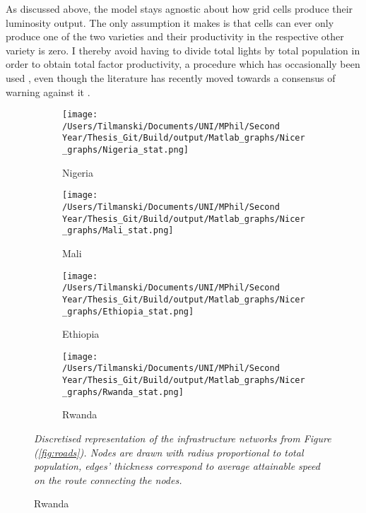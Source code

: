 \documentclass[11pt, oneside]{article}   	%
\let\oldref\ref
\renewcommand{\ref}[1]{(\oldref{#1})}
\newcommand{\mysubcaption}[1]{
\justify
\begin{spacing}{0.7}
\textit{\footnotesize #1}
\end{spacing}}
\begin{document}
As discussed above, the model stays agnostic about how grid cells produce their luminosity output. The only assumption it makes is that cells can ever only produce one of the two varieties and their productivity in the respective other variety is zero. I thereby avoid having to divide total lights by total population in order to obtain total factor productivity, a procedure which has occasionally been used \citep[see e.g.][]{DeLuca_Ethnicfavoritismaxiom_2018}, even though the literature has recently moved towards a consensus of warning against it \citep{Michalopoulos_SpatialPatternsDevelopment_2018}.

\begin{figure}[t]
\centering
\caption{Discretised Networks for Different Countries}

\begin{subfigure}[c]{0.45\textwidth}
\texttt{[image: /Users/Tilmanski/Documents/UNI/MPhil/Second Year/Thesis\_Git/Build/output/Matlab\_graphs/Nicer\_graphs/Nigeria\_stat.png]}
\caption{Nigeria}
\label{fig:nigeria_mat}
\end{subfigure}
\begin{subfigure}[c]{0.45\textwidth}
\texttt{[image: /Users/Tilmanski/Documents/UNI/MPhil/Second Year/Thesis\_Git/Build/output/Matlab\_graphs/Nicer\_graphs/Mali\_stat.png]}
\caption{Mali}
\label{fig:Mali_mat}
\end{subfigure}

\begin{subfigure}[c]{0.45\textwidth}
\texttt{[image: /Users/Tilmanski/Documents/UNI/MPhil/Second Year/Thesis\_Git/Build/output/Matlab\_graphs/Nicer\_graphs/Ethiopia\_stat.png]}
\caption{Ethiopia}
\label{fig:Ethiopia_mat}
\end{subfigure}
\begin{subfigure}[c]{0.45\textwidth}
\texttt{[image: /Users/Tilmanski/Documents/UNI/MPhil/Second Year/Thesis\_Git/Build/output/Matlab\_graphs/Nicer\_graphs/Rwanda\_stat.png]}
\caption{Rwanda}
\label{fig:Rwanda_mat}
\end{subfigure}
\mysubcaption{Discretised representation of the infrastructure networks from Figure \ref{fig:roads}. Nodes are drawn with radius proportional to total population, edges' thickness correspond to average attainable speed on the route connecting the nodes.}
\label{fig:matlab_networks}
\end{figure}
\end{document}

